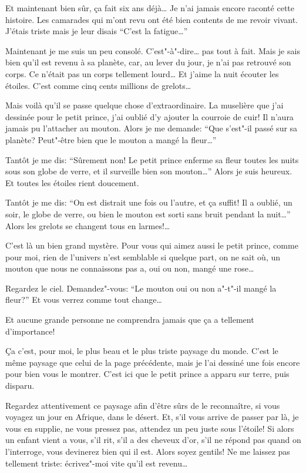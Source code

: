 \begin{Parallel}[p]{}{}
{Et maintenant bien sûr, ça fait six ans déjà\ldots{} Je n'ai jamais encore
raconté cette histoire. Les camarades qui m'ont revu ont été bien contents
de me revoir vivant. J'étais triste mais je leur disais ``C'est la fatigue\ldots{}''

Maintenant je me suis un peu consolé. C’est"-à"-dire\ldots{} pas tout à fait.
Mais je sais bien qu'il est revenu à sa planète, car, au lever du jour, je
n'ai pas retrouvé son corps. Ce n'était pas un corps tellement lourd\ldots{}
Et j'aime la nuit écouter les étoiles. C'est comme cinq cents millions de
grelots\ldots{}

Mais voilà qu'il se passe quelque chose d'extraordinaire. La muselière que 
j'ai dessinée pour le petit prince, j'ai oublié d'y ajouter la courroie de
cuir! Il n'aura jamais pu l'attacher au mouton. Alors je me demande: ``Que
s'est"-il passé sur sa planète? Peut"-être bien que le mouton a mangé la
fleur\ldots{}''

Tantôt je me dis: ``Sûrement non! Le petit prince enferme sa fleur toutes les
nuits sous son globe de verre, et il surveille bien son mouton\ldots{}'' Alors
je suis heureux. Et toutes les étoiles rient doucement.

Tantôt je me dis: ``On est distrait une fois ou l'autre, et ça suffit! Il a
oublié, un soir, le globe de verre, ou bien le mouton est sorti sans bruit
pendant la nuit\ldots{}'' Alors les grelots se changent tous en larmes!\ldots{}

\medskip

C'est là un bien grand mystère. Pour vous qui aimez aussi le petit prince,
comme pour moi, rien de l'univers n'est semblable si quelque part, on ne sait
où, un mouton que nous ne connaissons pas a, oui ou non, mangé une rose\ldots{}

Regardez le ciel. Demandez"-vous: ``Le mouton oui ou non a"-t"-il mangé la
fleur?'' Et vous verrez comme tout change\ldots{}

Et aucune grande personne ne comprendra jamais que ça a tellement d'importance!

Ça c'est, pour moi, le plus beau et le plus triste paysage du monde. C’est
le même paysage que celui de la page précédente, mais je l'ai dessiné une fois
encore pour bien vous le montrer. C'est ici que le petit prince a apparu sur
terre, puis disparu.

Regardez attentivement ce paysage afin d'être sûrs de le reconnaître, si vous
voyagez un jour en Afrique, dans le désert. Et, s'il vous arrive de passer par
là, je vous en supplie, ne vous pressez pas, attendez un peu juste sous l'étoile!
Si alors un enfant vient a vous, s'il rit, s'il a des cheveux d'or, s'il ne
répond pas quand on l'interroge, vous devinerez bien qui il est. Alors soyez
gentils! Ne me laissez pas tellement triste: écrivez"-moi vite qu'il est
revenu\ldots{}


}
\end{Parallel}
